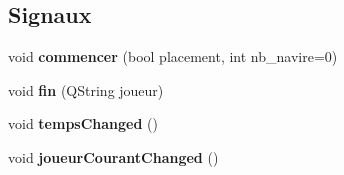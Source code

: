 \subsection*{Signaux}
\begin{DoxyCompactItemize}
\item 
void {\bfseries commencer} (bool placement, int nb\+\_\+navire=0)\hypertarget{class_partie_ad0d567419621d3c7c858a2b005e3e608}{}\label{class_partie_ad0d567419621d3c7c858a2b005e3e608}

\item 
void {\bfseries fin} (Q\+String joueur)\hypertarget{class_partie_a7997238d07a53ad08643b8c280f935db}{}\label{class_partie_a7997238d07a53ad08643b8c280f935db}

\item 
void {\bfseries temps\+Changed} ()\hypertarget{class_partie_a3c9c660c219c59797242aceaaf4ac76c}{}\label{class_partie_a3c9c660c219c59797242aceaaf4ac76c}

\item 
void {\bfseries joueur\+Courant\+Changed} ()\hypertarget{class_partie_a674d35b9052ea2d0a1b63bceea331111}{}\label{class_partie_a674d35b9052ea2d0a1b63bceea331111}

\end{DoxyCompactItemize}
